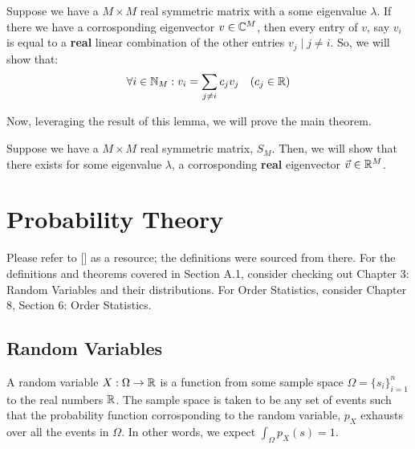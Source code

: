  Suppose we have a $M \times M$ real symmetric matrix with a some eigenvalue $\lambda$. If there we have a corrosponding eigenvector $v \in \mathbb{C}^M$, then every entry of $v$, say $v_i$ is equal to a \textbf{real} linear combination of the other entries $v_j \mid j \neq i$. So, we will show that:
$$\forall i \in \mathbb{N}_{M}: v_i =  {\sum_{j \neq i} c_j v_j} \quad (c_j \in \mathbb{R})$$

\lemmaproof \newline

\noindent Now, leveraging the result of this lemma, we will prove the main theorem.

\begin{theorem}[Taqi] Suppose we have a $M \times M$ real symmetric matrix, $S_M$. Then, we will show that there exists for some eigenvalue $\lambda$, a corrosponding \textbf{real} eigenvector $\vec{v} \in \mathbb{R}^M$.
\end{theorem}

\taqiproof

\newpage
\section{Probability Theory}

Please refer to [\cite{blitz}] as a resource; the definitions were sourced from there. For the definitions and theorems covered in Section A.1, consider checking out Chapter 3: Random Variables and their distributions. For Order Statistics, consider Chapter 8, Section 6: Order Statistics.

\subsection{Random Variables}

\begin{definition}
A random variable $X: \Omega \to \mathbb{R}$ is a function from some sample space $\Omega = \{s_i\}_{i=1}^n$ to the real numbers $\mathbb{R}$. The sample space is taken to be any set of events such that the probability function corrosponding to the random variable, $p_X$ exhausts over all the events in $\Omega$. In other words, we expect $\int_\Omega p_X(s) = 1$.
\end{definition}


